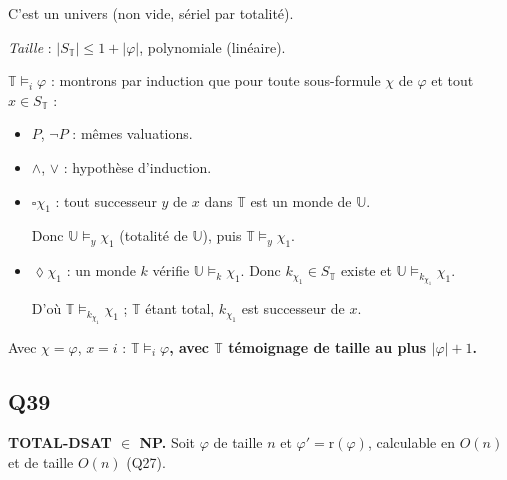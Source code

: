 \documentclass[11pt,a4paper]{article}
\providecommand{\Box}{\square}
\providecommand{\Diamond}{\lozenge}
\newcommand{\equationajustee}[1]{%
  \sbox{\boiteequation}{$\displaystyle #1$}%
  \ifdim\wd\boiteequation>\linewidth
    \[\resizebox{\linewidth}{!}{\usebox{\boiteequation}}\]%
  \else
    \[#1\]%
  \fi}
\begin{document}
C'est un univers (non vide, sériel par totalité).

\emph{Taille} : \(|S_{\mathbb T}|\le1+|\varphi|\), polynomiale (linéaire).

\emph{\(\mathbb T\models_i\varphi\)} : montrons par induction que pour toute sous-formule \(\chi\) de \(\varphi\) et tout \(x\in S_{\mathbb T}\) :

\equationajustee{\mathbb U\models_x\chi\Rightarrow\mathbb T\models_x\chi.}

\begin{itemize}
\item
  \(P\), \(\neg P\) : mêmes valuations.
\item
  \(\wedge\), \(\vee\) : hypothèse d'induction.
\item
  \(\Box\chi_1\) : tout successeur \(y\) de \(x\) dans \(\mathbb T\) est un monde de \(\mathbb U\).

  Donc \(\mathbb U\models_y\chi_1\) (totalité de \(\mathbb U\)), puis \(\mathbb T\models_y\chi_1\).
\item
  \(\Diamond\chi_1\) : un monde \(k\) vérifie \(\mathbb U\models_k\chi_1\). Donc \(k_{\chi_1}\in S_{\mathbb T}\) existe et \(\mathbb U\models_{k_{\chi_1}}\chi_1\).

  D'où \(\mathbb T\models_{k_{\chi_1}}\chi_1\) ; \(\mathbb T\) étant total, \(k_{\chi_1}\) est successeur de \(x\).
\end{itemize}

Avec \(\chi=\varphi\), \(x=i\) : \textbf{\(\mathbb T\models_i\varphi\), avec \(\mathbb T\) témoignage de taille au plus \(|\varphi|+1\).}

\hypertarget{q39}{%
\subsection{Q39}\label{q39}}

\textbf{TOTAL-DSAT \(\in\) NP.} Soit \(\varphi\) de taille \(n\) et \(\varphi'=\mathrm r(\varphi)\), calculable en \(O(n)\) et de taille \(O(n)\) (Q27).
\end{document}
